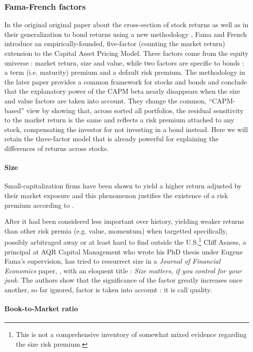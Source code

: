 \subsubsection{Fama-French factors}
In the original original paper about the cross-section of stock returns \parencite{Fama1992} as well as in their generalization to bond returns using a new methodology \parencite{Fama1993}, Fama and French introduce an empirically-founded, five-factor (counting the market return) extension to the Capital Asset Pricing Model. Three factors come from the equity universe : market return, size and value, while two factors are specific to bonds : a term (i.e. maturity) premium and a default risk premium. The methodology in the later paper provides a common framework for stocks and bonds and conclude that the explanatory power of the CAPM beta nearly disappears when the size and value factors are taken into account. They change the common, ``CAPM-based'' view by showing that, across sorted all portfolios, the residual sensitivity to the market return is the same and reflects a risk premium attached to any stock, compensating the investor for not investing in a bond instead. Here we will retain the three-factor model that is already powerful for explaining the differences of returns across stocks.
\paragraph{Size}
Small-capitalization firms have been shown to yield a higher return adjusted by their market exposure and this phenomenon justifies the existence of a risk premium according to \cite{Fama1992}.

After it had been considered less important over history, yielding weaker returns than other risk premia (e.g. value, momentum) when targetted specifically, possibly arbitraged away or at least hard to find outside the U.S.\footnote{This is not a comprehensive inventory of somewhat mixed evidence regarding the size risk premium.} Cliff Asness, a principal at AQR Capital Management who wrote his PhD thesis under Eugene Fama's supervision, has tried to ressurrect size in a \emph{Journal of Financial Economics} paper, \cite{Asness2018}, with an eloquent title : \emph{Size matters, if you control for your junk}. The authors show that the significance of the factor greatly increases once another, so far ignored, factor is taken into account : it is call quality.
\paragraph{Book-to-Market ratio}


